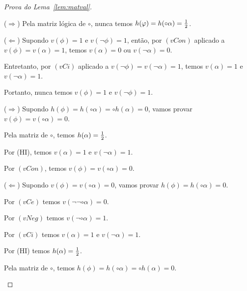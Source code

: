 \begin{proof}[Prova do Lema~\ref{lem:matval}]
\begin{provaporcasos}
\begin{provaporsubcasos}
                        
                        ($\Longrightarrow$) Pela matriz lógica de $\circ$, nunca temos $h(\varphi) = h(\circ \alpha) = \frac{1}{2}{}$.
                        
                        ($\Longleftarrow$) Supondo $v(\phi) = 1$ e $v(\neg \phi) = 1$, então, por $(vCon)$ aplicado a $v(\phi) = v(\alpha) = 1$, temos $v(\alpha) = 0$ ou $v(\neg \alpha) = 0$. 
                        
                        Entretanto, por $(vCi)$ aplicado a $v(\neg \phi) = v(\neg \alpha) = 1$, temos $v(\alpha) = 1$ e $v(\neg \alpha) = 1$.

                        Portanto, nunca temos $v(\phi) = 1$ e $v(\neg \phi) = 1$.

                        
                    

                        ($\Longrightarrow$) Supondo $h(\phi) = h(\circ \alpha) = \circ h(\alpha) = 0$, vamos provar $v(\phi) = v(\circ \alpha) = 0$.

                        Pela matriz de $\circ$, temos $h(\alpha) = \frac{1}{2}{}$.

                        Por (HI), temos $v(\alpha) = 1$ e $v(\neg \alpha) = 1$. 
                        
                        Por $(vCon)$, temos $v(\phi) = v(\circ \alpha) = 0$.
                    
                        ($\Longleftarrow$) Supondo $v(\phi) = v(\circ \alpha) = 0$, vamos provar $h(\phi) = h(\circ \alpha) = 0$.

                        Por $(vCe)$ temos $v(\neg \neg \circ \alpha) = 0$.

                        Por $(vNeg)$ temos $v(\neg \circ \alpha) = 1$.

                        Por $(vCi)$ temos $v(\alpha) = 1$ e $v(\neg \alpha) = 1$.

                        Por (HI) temos $h(\alpha) = \frac{1}{2}{}$.

                        Pela matriz de $\circ$, temos $h(\phi) = h(\circ \alpha) = \circ h(\alpha) = 0$.
                    
            \end{provaporsubcasos}
        

\end{provaporcasos}
\end{proof}
